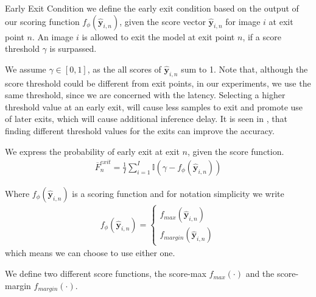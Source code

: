 \begin{enumdescript}
		\item[Early Exit Condition] we define the early exit condition based on the output of our scoring function $ f_\phi(\bm{\hat{y}}_{i,n}) $, given the score vector $ \bm{\hat{y}}_{i,n} $ for image $ i $ at exit point $ n $. An image $ i $ is allowed to exit the model at exit point $ n $, if a score threshold $ \gamma $ is surpassed. 
		
		We assume $	\gamma \in \left[0,1\right] $, as the all scores of  $ \bm{\hat{y}}_{i,n} $ sum to 1. Note that, although the score threshold could be different from exit points, in our experiments, we use the same threshold, since we are concerned with the latency. Selecting a higher threshold value at an early exit, will cause less samples to exit and promote use of later exits, which will cause additional inference delay. It is seen in \cite{teerapittayanon_finding_2018}, that finding different threshold values for the exits can improve the accuracy.
		
		We express the probability of early exit at exit $ n $, given the score function. 
		\begin{align}
		\overline{F}^{exit}_n = \frac{1}{I}\sum_{i=1}^{I} \mathbb{I} \left(\gamma-f_{\phi}\left(\bm{\hat{y}}_{i,n}\right) \right)
		\end{align}
		
		Where $ f_\phi\left(\bm{\hat{y}}_{i,n}\right) $ is a scoring function and for notation simplicity we write 
		\begin{align}
			f_{\phi}\left(\bm{\hat{y}}_{i,n}\right) = \begin{cases}
			 	f_{max}\left(\bm{\hat{y}}_{i,n}\right)\\
			 	f_{margin}\left(\bm{\hat{y}}_{i,n}\right)
			\end{cases}
		\end{align}
		which means we can choose to use either one.
		
		We define two different score functions, the score-max $ f_{max}(\cdot) $ and the score-margin $ f_{margin}(\cdot) $. 
		
		\begin{enumdescript}
			

\end{enumdescript}
\end{enumdescript}
